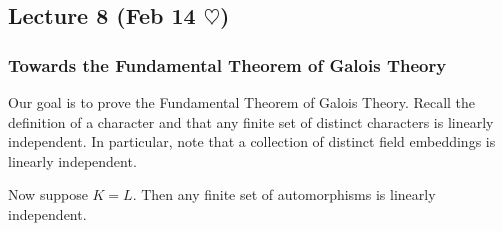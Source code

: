 \message{ !name(notes.tex)}\documentclass[10pt, twoside]{article}
\begin{document}
    \subsection{Lecture 8 (Feb 14 $\heartsuit$)}
    \subsubsection{Towards the Fundamental Theorem of Galois Theory}

    Our goal is to prove the Fundamental Theorem of Galois Theory. Recall the definition of a character and that any finite set of distinct characters is linearly independent. In particular, note that a collection of distinct field embeddings is linearly independent.

    Now suppose $K = L$. Then any finite set of automorphisms is linearly independent.
\end{document}
